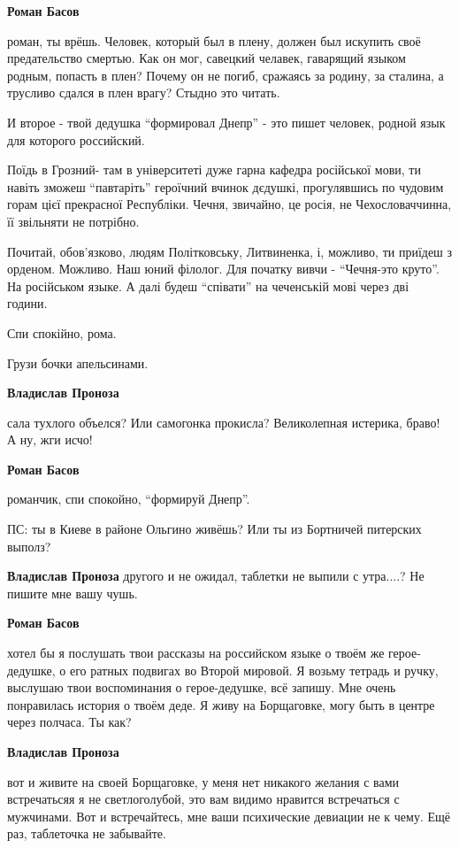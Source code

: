 \begin{itemize}
\begin{itemize}
\begin{itemize}
\textbf{Роман Басов} 

роман, ты врёшь. Человек, который был в плену, должен был искупить своё
предательство смертью. Как он мог, савецкий челавек, гаварящий языком
родным, попасть в плен? Почему он не погиб, сражаясь за родину, за сталина, а
трусливо сдался в плен врагу? Стыдно это читать.

И второе - твой дедушка \enquote{формировал Днепр} - это пишет человек, родной язык для
которого российский.

Поїдь в Грозний- там в університеті дуже гарна кафедра російської мови, ти
навіть зможеш \enquote{павтаріть} героїчний вчинок дєдушкі, прогулявшись по чудовим
горам цієї прекрасної Республіки. Чечня, звичайно, це росія, не Чехословаччинна, її
звільняти не потрібно.

Почитай, обов’язково, людям Політковську, Литвиненка, і, можливо, ти приїдеш з
орденом. Можливо. Наш юний філолог. Для початку вивчи - \enquote{Чечня-это круто}. На
російськом языке. А далі будеш \enquote{співати} на чеченській мові через дві години.

Спи спокійно, рома.

Грузи бочки апельсинами.


\textbf{Владислав Проноза} 

сала тухлого объелся? Или самогонка прокисла? Великолепная истерика, браво! А ну, жги исчо!

\textbf{Роман Басов} 

романчик, спи спокойно, \enquote{формируй Днепр}.

ПС: ты в Киеве в районе Ольгино живёшь? Или ты из Бортничей питерских выполз?


\textbf{Владислав Проноза} другого и не ожидал, таблетки не выпили с утра....? Не пишите мне вашу чушь.

\textbf{Роман Басов} 

хотел бы я послушать твои рассказы на российском языке о твоём же
герое-дедушке, о его ратных подвигах во Второй мировой. Я возьму тетрадь и
ручку, выслушаю твои воспоминания о герое-дедушке, всё запишу. Мне очень
понравилась история о твоём деде. Я живу на Борщаговке, могу быть в центре через
полчаса. Ты как?

\textbf{Владислав Проноза} 

вот и живите на своей Борщаговке, у меня нет никакого желания с вами
встречатьсяя я не светлоголубой, это вам видимо нравится встречаться с
мужчинами. Вот и встречайтесь, мне ваши психические девиации не к чему. Ещё
раз, таблеточка не забывайте.



\end{itemize}
\end{itemize}
\end{itemize}
